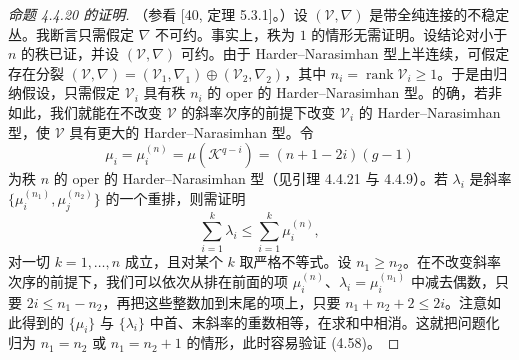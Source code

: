 \begin{proof}[命题 4.4.20 的证明]
（参看 [40, 定理 5.3.1]。）设 $(\mathcal{V},\nabla)$ 是带全纯连接的不稳定丛。我断言只需假定 $\nabla$ 不可约。事实上，秩为 $1$ 的情形无需证明。设结论对小于 $n$ 的秩已证，并设 $(\mathcal{V},\nabla)$ 可约。由于 Harder--Narasimhan 型上半连续，可假定存在分裂 $(\mathcal{V},\nabla)=(\mathcal{V}_1,\nabla_1)\oplus(\mathcal{V}_2,\nabla_2)$，其中 $n_i=\operatorname{rank}\mathcal{V}_i\ge1$。于是由归纳假设，只需假定 $\mathcal{V}_i$ 具有秩 $n_i$ 的 oper 的 Harder--Narasimhan 型。的确，若非如此，我们就能在不改变 $\mathcal{V}$ 的斜率次序的前提下改变 $\mathcal{V}_i$ 的 Harder--Narasimhan 型，使 $\mathcal{V}$ 具有更大的 Harder--Narasimhan 型。令
\begin{equation}
\mu_i=\mu_i^{(n)}=\mu(\mathcal{K}^{q-i})=(n+1-2i)(g-1)
\tag{4.57}
\end{equation}
为秩 $n$ 的 oper 的 Harder--Narasimhan 型（见引理 4.4.21 与 4.4.9）。若 $\lambda_i$ 是斜率 $\{\mu_i^{(n_1)},\mu_j^{(n_2)}\}$ 的一个重排，则需证明
\begin{equation}
\sum_{i=1}^k\lambda_i\le\sum_{i=1}^k\mu_i^{(n)},
\tag{4.58}
\end{equation}
对一切 $k=1,\dots,n$ 成立，且对某个 $k$ 取严格不等式。设 $n_1\ge n_2$。在不改变斜率次序的前提下，我们可以依次从排在前面的项 $\mu_i^{(n)}$、$\lambda_i=\mu_i^{(n_1)}$ 中减去偶数，只要 $2i\le n_1-n_2$，再把这些整数加到末尾的项上，只要 $n_1+n_2+2\le2i$。注意如此得到的 $\{\mu_i\}$ 与 $\{\lambda_i\}$ 中首、末斜率的重数相等，在求和中相消。这就把问题化归为 $n_1=n_2$ 或 $n_1=n_2+1$ 的情形，此时容易验证 (4.58)。


\end{proof}
